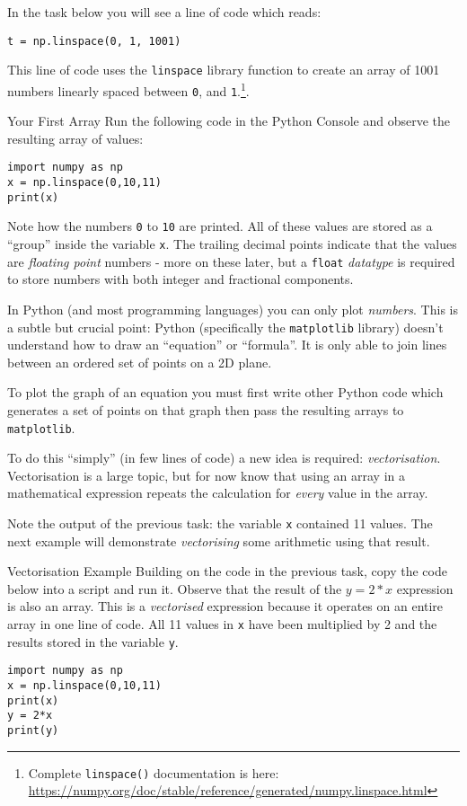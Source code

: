 \documentclass{lab}
\begin{document}
In the task below you will see a line of code which reads:

\begin{lstlisting}
t = np.linspace(0, 1, 1001)
\end{lstlisting}

This line of code uses the \texttt{linspace} library function to create an array of 1001 numbers linearly spaced between \texttt{0}, and \texttt{1}.\footnote{Complete \texttt{linspace()} documentation is here: \url{https://numpy.org/doc/stable/reference/generated/numpy.linspace.html}}.

\begin{task}{Your First Array}{}
Run the following code in the Python Console and observe the resulting array of values:

\begin{lstlisting}[style=myPython]
import numpy as np
x = np.linspace(0,10,11)
print(x)
\end{lstlisting}

Note how the numbers \texttt{0} to \texttt{10} are printed. All of these values are stored as a ``group'' inside the variable \texttt{x}. The trailing decimal points indicate that the values are \textit{floating point} numbers - more on these later, but a \texttt{float} \textit{datatype} is required to store numbers with both integer and fractional components.
\end{task}

In Python (and most programming languages) you can only plot \textit{numbers}. This is a subtle but crucial point: Python (specifically the \texttt{matplotlib} library) doesn't understand how to draw an ``equation'' or ``formula''. It is only able to join lines between an ordered set of points on a 2D plane.

To plot the graph of an equation you must first write other Python code which generates a set of points on that graph then pass the resulting arrays to \texttt{matplotlib}.

To do this ``simply'' (in few lines of code) a new idea is required: \textit{vectorisation}. Vectorisation is a large topic, but for now know that using an array in a mathematical expression repeats the calculation for \textit{every} value in the array.

Note the output of the previous task: the variable \texttt{x} contained 11 values. The next example will demonstrate \textit{vectorising} some arithmetic using that result.

\begin{task}{Vectorisation Example}{}
Building on the code in the previous task, copy the code below into a script and run it. Observe that the result of the $y = 2*x$ expression is also an array. This is a \textit{vectorised} expression because it operates on an entire array in one line of code. All 11 values in \texttt{x} have been multiplied by 2 and the results stored in the variable \texttt{y}.

\begin{lstlisting}[style=myPython]
import numpy as np
x = np.linspace(0,10,11)
print(x)
y = 2*x
print(y)
\end{lstlisting}

\end{task}
\end{document}
